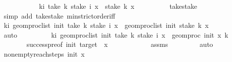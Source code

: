 \begin{isabellebody}
\ \ \ \ \isamarkupfalse%
{\isacharminus}{\kern0pt}\isanewline
\ \ \ \ \ \ \isamarkupfalse%
{\isachardoublequoteopen}{\isasymforall}k{\isacharless}{\kern0pt}i{\isachardot}{\kern0pt}\ take\ k\ {\isacharparenleft}{\kern0pt}stake\ i\ x{\isacharparenright}{\kern0pt}\ {\isacharequal}{\kern0pt}\ stake\ k\ x{\isachardoublequoteclose}\isanewline
\ \ \ \ \ \ \ \ \isamarkupfalse%
\ take{\isacharunderscore}{\kern0pt}stake\isanewline
\ \ \ \ \ \ \ \ \isamarkupfalse%
\ {\isacharparenleft}{\kern0pt}simp\ add{\isacharcolon}{\kern0pt}\ take{\isacharunderscore}{\kern0pt}stake\ min{\isachardot}{\kern0pt}strict{\isacharunderscore}{\kern0pt}order{\isacharunderscore}{\kern0pt}iff{\isacharparenright}{\kern0pt}\isanewline
\ \ \ \ \ \ \isamarkupfalse%
\ \isamarkupfalse%
\ {\isachardoublequoteopen}{\isasymforall}k{\isacharless}{\kern0pt}i{\isachardot}{\kern0pt}\ geom{\isacharunderscore}{\kern0pt}proc{\isacharunderscore}{\kern0pt}list\ {\isacharparenleft}{\kern0pt}init{\isacharparenright}{\kern0pt}\ {\isacharparenleft}{\kern0pt}take\ k\ {\isacharparenleft}{\kern0pt}stake\ i\ x{\isacharparenright}{\kern0pt}{\isacharparenright}{\kern0pt}\ {\isacharequal}{\kern0pt}\ geom{\isacharunderscore}{\kern0pt}proc{\isacharunderscore}{\kern0pt}list\ init\ {\isacharparenleft}{\kern0pt}stake\ k\ x{\isacharparenright}{\kern0pt}{\isachardoublequoteclose}\isanewline
\ \ \ \ \ \ \ \ \isamarkupfalse%
\ auto\isanewline
\ \ \ \ \ \ \isamarkupfalse%
\ \isamarkupfalse%
\ {\isachardoublequoteopen}{\isasymforall}k{\isacharless}{\kern0pt}i{\isachardot}{\kern0pt}\ geom{\isacharunderscore}{\kern0pt}proc{\isacharunderscore}{\kern0pt}list\ {\isacharparenleft}{\kern0pt}init{\isacharparenright}{\kern0pt}\ {\isacharparenleft}{\kern0pt}take\ k\ {\isacharparenleft}{\kern0pt}stake\ i\ x{\isacharparenright}{\kern0pt}{\isacharparenright}{\kern0pt}\ {\isacharequal}{\kern0pt}\ geom{\isacharunderscore}{\kern0pt}proc\ init\ x\ k{\isachardoublequoteclose}\isanewline
\ \ \ \ \ \ \isamarkupfalse%
\ success{\isacharunderscore}{\kern0pt}pre{\isacharbrackleft}{\kern0pt}of\ init\ target\ {\isacharunderscore}{\kern0pt}\ x{\isacharbrackright}{\kern0pt}\isanewline
\ \ \ \ \ \ \ \ \ \ \ \ assms\ \isanewline
\ \ \ \ \ \ \isamarkupfalse%
\ auto\isanewline
\ \ \ \ \isamarkupfalse%
\ nonempty{\isacharcolon}{\kern0pt}{\isachardoublequoteopen}reach{\isacharunderscore}{\kern0pt}steps\ {\isacharparenleft}{\kern0pt}init{\isacharparenright}{\kern0pt}\ x\isanewline

\end{isabellebody}
